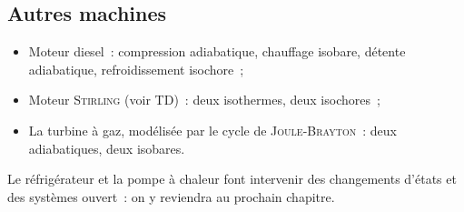 \documentclass[../../main/main.tex]{subfiles}
\begin{document}
\subsection{Autres machines}
\begin{itemize}
  \item Moteur diesel~: compression adiabatique, chauffage isobare, détente
    adiabatique, refroidissement isochore~;
  \item Moteur \textsc{Stirling} (voir TD)~: deux isothermes, deux
    isochores~;
  \item La turbine à gaz, modélisée par le cycle de \textsc{Joule-Brayton}~:
    deux adiabatiques, deux isobares.
\end{itemize}
Le réfrigérateur et la pompe à chaleur font intervenir des changements d'états
et des systèmes ouvert~: on y reviendra au prochain chapitre.
\end{document}
